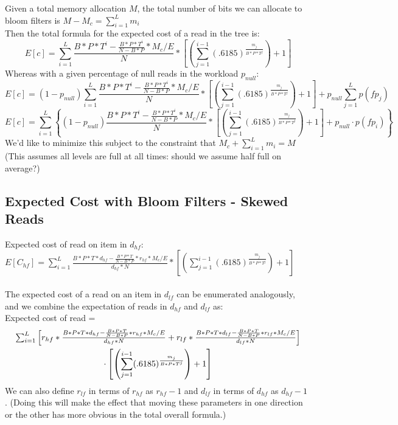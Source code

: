 \documentclass[11pt]{article}
\theoremstyle{plain}
\theoremstyle{definition}
\begin{document}
Given a total memory allocation $M$, the total number of bits we can allocate to bloom filters is $M-M_c = \sum_{i=1}^L m_i$ \\
Then the total formula for the expected cost of a read in the tree is: 
$$E[c] = \sum_{i=1}^{L} \frac{B*P*T^i - \frac{B*P*T^i}{N-B*P} * M_c/E}{N} * \left[ \left(\sum_{j=1}^{i-1} (.6185) ^  {\frac{m_j}{B*P*T^j}}\right) +1 \right]$$ 
Whereas with a given percentage of null reads in the workload $p_{null}$:
$$E[c] = (1-p_{null})\sum_{i=1}^{L} \frac{B*P*T^i - \frac{B*P*T^i}{N-B*P} * M_c/E}{N} * \left[ \left(\sum_{j=1}^{i-1} (.6185) ^  {\frac{m_j}{B*P*T^j}}\right) +1 \right] + p_{null}\sum_{j=1}^{L} p(fp_j)$$
$$E[c] = \sum_{i=1}^{L} \left\{(1-p_{null})\frac{B*P*T^i - \frac{B*P*T^i}{N-B*P} * M_c/E}{N} * \left[ \left(\sum_{j=1}^{i-1} (.6185) ^  {\frac{m_j}{B*P*T^j}}\right) +1 \right] + p_{null} \cdot p(fp_i) \right\}$$
We'd like to minimize this subject to the constraint that $M_c + \sum_{i=1}^L m_i = M$ \\
(This assumes all levels are full at all times: should we assume half full on average?)

\subsection{Expected Cost with Bloom Filters - Skewed Reads}

Expected cost of read on item in $d_{hf}$: $E[C_{hf}]= \sum_{i=1}^L \frac{B*P * T*d_{hf} - \frac{B*P * T}{N-B*P} * r_{hf} * M_c/E}{d_{hf} * N} * \left[ \left(\sum_{j=1}^{i-1} (.6185) ^  {\frac{m_j}{B*P*T^j}}\right) +1 \right]$\\ \\

The expected cost of a read on an item in $d_{lf}$ can be enumerated analogously, and we combine the expectation of reads in $d_{hf}$ and $d_{lf}$ as: \\
Expected cost of read = 
\begin{multline}
$$ \sum_{i=1}^L \left[ r_{hf} *\frac{B*P * T*d_{hf} - \frac{B*P * T}{N-B*P} * r_{hf} * M_c/E}{d_{hf} * N} + r_{lf} * \frac{B*P * T*d_{lf} - \frac{B*P * T}{N-B*P} * r_{lf} * M_c/E}{d_{lf} * N} \right] \\ \cdot \left[ \left(\sum_{j=1}^{i-1} (.6185) ^  {\frac{m_j}{B*P*T^j}}\right) +1 \right]$$\end{multline}
We can also define $r_{lf}$ in terms of $r_{hf}$ as $r_{hf} - 1$ and  $d_{lf}$ in terms of $d_{hf}$ as $d_{hf} - 1$ . (Doing this will make the effect that moving these parameters in one direction or the other has more obvious in the total overall formula.)
\end{document}
